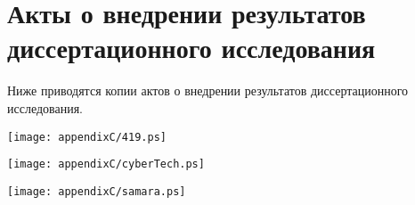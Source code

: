 \chapter{Акты о внедрении результатов диссертационного исследования} \label{appendixC}

Ниже приводятся копии актов о внедрении результатов диссертационного 
исследования.

\newpage

\begin{center}
	\texttt{[image: appendixC/419.ps]}
\end{center}

\begin{center}
	\texttt{[image: appendixC/cyberTech.ps]}
\end{center}

\begin{center}
	\texttt{[image: appendixC/samara.ps]}
\end{center}
